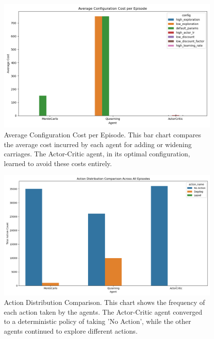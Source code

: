 \documentclass{article}
\begin{document}
\begin{figure}[h!]
    \centering
    \includegraphics[width=\textwidth]{figures/avg_config_cost.png}
    \caption{Average Configuration Cost per Episode. This bar chart compares the average cost incurred by each agent for adding or widening carriages. The Actor-Critic agent, in its optimal configuration, learned to avoid these costs entirely.}
    \label{fig:avg_cost}
\end{figure}

\begin{figure}[h!]
    \centering
    \includegraphics[width=\textwidth]{figures/action_distribution.png}
    \caption{Action Distribution Comparison. This chart shows the frequency of each action taken by the agents. The Actor-Critic agent converged to a deterministic policy of taking 'No Action', while the other agents continued to explore different actions.}
    \label{fig:action_dist}
\end{figure}
\end{document}
